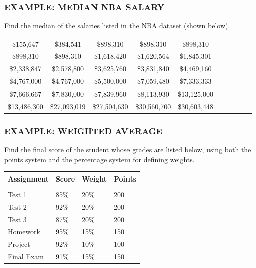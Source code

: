 \documentclass[8pt]{beamer}
\newcommand{\extitle}[1]{\frametitle{\fontfamily{fvs}\selectfont \small\color{black!70!blue!80!cyan}\uppercase{\bfseries Example: #1}}}
\def\solblank{\begin{tcolorbox}[colframe=black!50!blue!50!cyan,
colback=white,
bottomrule=0mm,
rightrule=0mm,
sharp corners=all] 
\vspace{6in}
\text{}
\end{tcolorbox}}
\begin{document}
\begin{frame}
\extitle{Median NBA Salary}
Find the median of the salaries listed in the NBA dataset (shown below).
\begin{center}
\begin{tabular}{c c c c c c c c c c}
\$155,647 & 
\$384,541 & 
\$898,310 & 
\$898,310 & 
\$898,310\\
\$898,310 & 
\$898,310 & 
\$1,618,420 & 
\$1,620,564 & 
\$1,845,301\\ 
\$2,338,847 & 
\$2,578,800 & 
\$3,625,760 & 
\$3,831,840 & 
\$4,469,160\\
\$4,767,000 & 
\$4,767,000 & 
\$5,500,000 & 
\$7,059,480 & 
\$7,333,333\\
\$7,666,667 & 
\$7,830,000 & 
\$7,839,960 & 
\$8,113,930 & 
\$13,125,000\\
\$13,486,300 & 
\$27,093,019 & 
\$27,504,630 & 
\$30,560,700 & 
\$30,603,448
\end{tabular}
\end{center}

\solblank
\end{frame}

\begin{frame}
\extitle{Weighted Average}
Find the final score of the student whose grades are listed below, using both the points system and the percentage system for defining weights.
\begin{center}
\begin{tabular}{l l l l}
\textbf{Assignment} & \textbf{Score} & \textbf{Weight} & \textbf{Points}\\
\hline
& \\
Test 1 & 85\% & 20\% & 200\\
Test 2 & 92\% & 20\% & 200\\
Test 3 & 87\% & 20\% & 200\\
Homework & 95\% & 15\% & 150\\
Project & 92\% & 10\% & 100\\
Final Exam & 91\% & 15\% & 150
\end{tabular}
\end{center}

\solblank
\end{frame}
\end{document}
